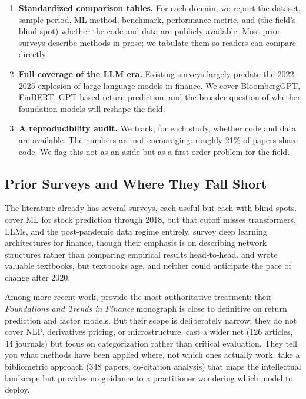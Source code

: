\begin{enumerate}[leftmargin=*]
    \item \textbf{Standardized comparison tables.} For each domain, we report the dataset, sample period, ML method, benchmark, performance metric, and (the field's blind spot) whether the code and data are publicly available. Most prior surveys describe methods in prose; we tabulate them so readers can compare directly.

    \item \textbf{Full coverage of the LLM era.} Existing surveys largely predate the 2022--2025 explosion of large language models in finance. We cover BloombergGPT, FinBERT, GPT-based return prediction, and the broader question of whether foundation models will reshape the field.

    \item \textbf{A reproducibility audit.} We track, for each study, whether code and data are available. The numbers are not encouraging: roughly 21\% of papers share code. We flag this not as an aside but as a first-order problem for the field.
\end{enumerate}

\subsection{Prior Surveys and Where They Fall Short}

The literature already has several surveys, each useful but each with blind spots. \citet{Henrique2019} cover ML for stock prediction through 2018, but that cutoff misses transformers, LLMs, and the post-pandemic data regime entirely. \citet{Ozbayoglu2020} survey deep learning architectures for finance, though their emphasis is on describing network structures rather than comparing empirical results head-to-head. \citet{DePrado2018} and \citet{Dixon2020} wrote valuable textbooks, but textbooks age, and neither could anticipate the pace of change after 2020.

Among more recent work, \citet{KellyXiu2023} provide the most authoritative treatment: their \textit{Foundations and Trends in Finance} monograph is close to definitive on return prediction and factor models. But their scope is deliberately narrow; they do not cover NLP, derivatives pricing, or microstructure. \citet{NazarethReddy2023} cast a wider net (126 articles, 44 journals) but focus on categorization rather than critical evaluation. They tell you what methods have been applied where, not which ones actually work. \citet{Goodell2022} take a bibliometric approach (348 papers, co-citation analysis) that maps the intellectual landscape but provides no guidance to a practitioner wondering which model to deploy.

